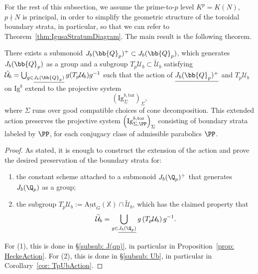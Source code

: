 \documentclass[letterpaper,11pt]{amsart}
\begin{document}
For the rest of this subsection, we assume the prime-to-$p$ level $K^p=K(N)$, $p\nmid N$ is principal, in order to simplify the geometric structure of the toroidal boundary strata, in particular, so that we can refer to Theorem~\ref{thm:IgusaStratumDiagram}. The main result is the following theorem. 
\begin{theorem}\label{thm: JbPreservesStrata}
There exists a submonoid $J_{b}(\bb{Q}_{p})^{+} \subset J_{b}(\bb{Q}_{p})$, which generates $J_{b}(\bb{Q}_{p})$ as a group  and a subgroup $T_{p}\mathcal{U}_{b} \subset \tilde{\mathcal{U}}_{b}$ satisfying $\tilde{\mathcal{U}}_{b} = \bigcup_{g \in \underline{J_{b}(\bb{Q}_{p})}} g(T_{p}\mathcal{U}_{b})g^{-1}$ such that the action of 
$\underline{J_{b}(\bb{Q}_{p})^{+}}$ and $T_{p}\mathcal{U}_{b}$ on $\mathrm{Ig}^b$ extend to the projective system 
\[ \left(\mathrm{Ig}^{b,\mathrm{tor}}_{\Sigma}\right)_{\Sigma},\] where $\Sigma$ runs over good compatible choices of cone decomposition. This extended action preserves the projective system $\left(\mathrm{Ig}^{b,\mathrm{tor}}_{\Sigma,\PP}\right)_{\Sigma}$ consisting of boundary strata labeled by $\PP$, for each conjugacy class of admissible parabolics $\PP$. 
\end{theorem}

\begin{proof}
As stated, it is enough to construct the extension of the action and prove the desired preservation of the boundary strata for:
\begin{enumerate}
\item the constant scheme attached to a submonoid $J_b(\Q_p)^+$ that generates $J_b(\Q_p)$ as a group;
\item the subgroup $T_p\mathcal{U}_b:=\underline{\mathrm{Aut}}_{G}(\mathbb{X})\cap \widetilde{\mathcal{U}}_b$, which has the claimed property that 
\[
\widetilde{\mathcal{U}}_b = \bigcup_{g\in \underline{J_b(\Q_p)}} g\left(T_p\mathcal{U}_b\right)g^{-1}.
\]
\end{enumerate}
For (1), this is done in \S \ref{subsub: J(qp)}, in particular in Proposition~\ref{prop: HeckeAction}. 
For (2), this is done in \S \ref{subsub: Ub}, in particular in Corollary~\ref{cor: TpUbAction}.
\end{proof}

\end{document}
